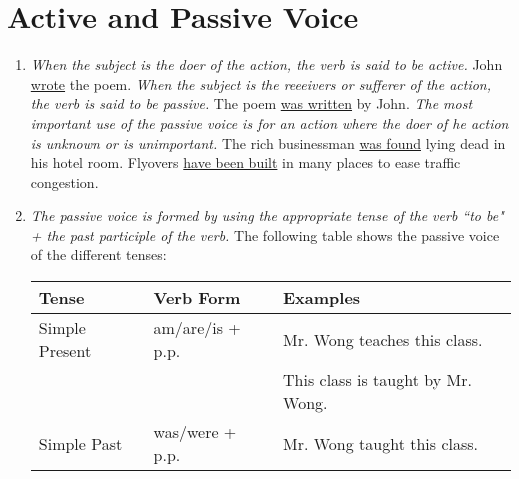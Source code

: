 \section{Active and Passive Voice}

\begin{enumerate}
    \item
        {\it
        When the subject is the doer of the action, the verb is said to be
        active.
        }
        \newline
        John \underline{wrote} the poem.
        \newline
        \newline
        {\it
        When the subject is the reeeivers or sufferer of the action, the verb is
        said to be passive.
        }
        \newline
        The poem \underline{was written} by John.
        \newline
        \newline
        {\it
        The most important use of the passive voice is for an action where the
        doer of he action is unknown or is unimportant.
        }
        \newline
        The rich businessman \underline{was found} lying dead in his hotel room.
        \newline
        \newline
        Flyovers \underline{have been built} in many places to ease traffic
        congestion.
    \item
        {\it
        The passive voice is formed by using the appropriate tense of the verb
        ``to be" + the past participle of the verb.
        }
        \newline
        The following table shows the passive voice of the different tenses:
        \newline
        \begin{table}[h]
            \centering
            \begin{tabular}{|l|l|l|}
                \hline
                Tense
                & Verb Form
                & Examples \\ \hline \hline
                Simple Present
                & am/are/is + p.p.
                & Mr. Wong teaches this class. \\
                & & This class is taught by Mr. Wong.\\ \hline
                Simple Past
                & was/were + p.p.
                & Mr. Wong taught this class. \\

\end{tabular}
\end{table}
\end{enumerate}
